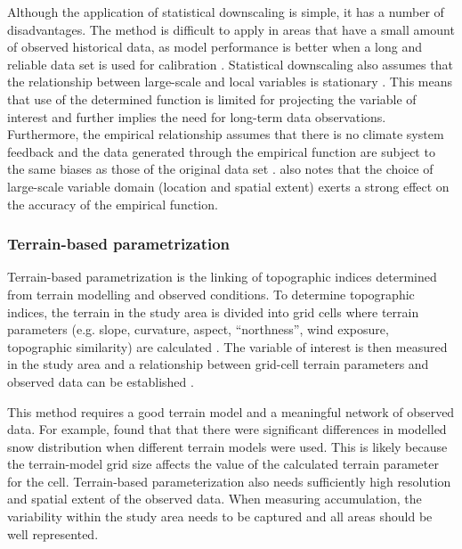 \documentclass[12pt]{article}
\begin{document}
Although the application of statistical downscaling is simple, it has a number of disadvantages. The method is difficult to apply in areas that have a small amount of observed historical data, as model performance is better when a long and reliable data set is used for calibration  \citep{Fowler2007}. Statistical downscaling also assumes that the relationship between large-scale and local variables is stationary \citep{Fowler2007}. This means that use of the determined function is limited for projecting the variable of interest and further implies the need for long-term data observations. Furthermore, the empirical relationship assumes that there is no climate system feedback and the data generated through the empirical function are subject to the same biases as those of the original data set \citep{Fowler2007}. \cite{Wilby2000} also notes that the choice of large-scale variable domain (location and spatial extent) exerts a strong effect on the accuracy of the empirical function.

\subsubsection{Terrain-based parametrization}
Terrain-based parametrization is the linking of topographic indices determined from terrain modelling and observed conditions. To determine topographic indices, the terrain in the study area is divided into grid cells where terrain parameters (e.g. slope, curvature, aspect, ``northness'', wind exposure, topographic similarity) are calculated \citep{Anderson2014,McGrath2015}. The variable of interest is then measured in the study area and a relationship between grid-cell terrain parameters and observed data can be established \citep[e.g.][]{Bloschl1991, Liston1998, Anderton2004,McGrath2015}. 

This method requires a good terrain model and a meaningful network of observed data. For example, \cite{Molotch2005} found that that there were significant differences in modelled snow distribution when different terrain models were used. This is likely because the terrain-model grid size affects the value of the calculated terrain parameter for the cell. Terrain-based parameterization also needs sufficiently high resolution and spatial extent of the observed data. When measuring accumulation, the variability within the study area needs to be captured and all areas should be well represented. 
\end{document}
